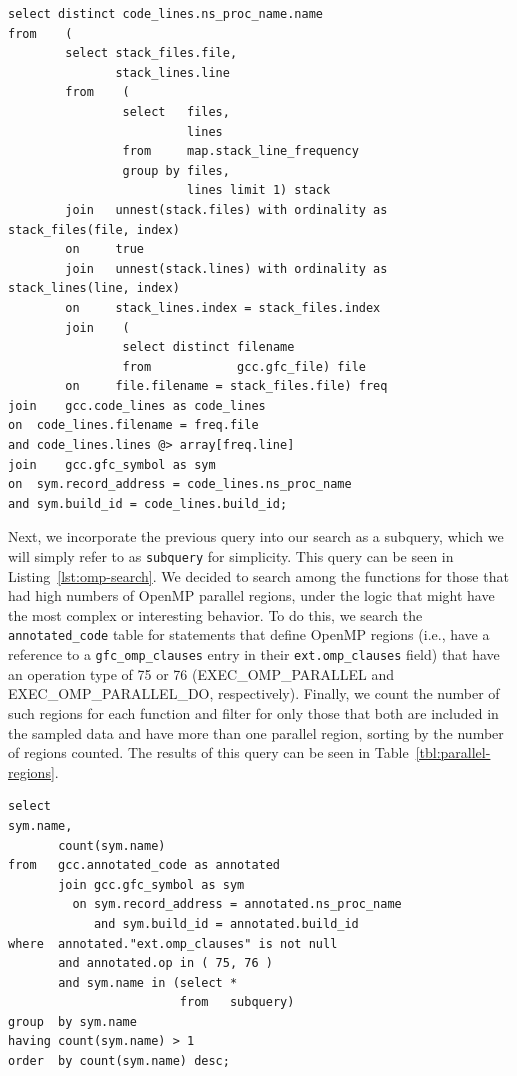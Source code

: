 \begin{lstlisting}[caption=Determing Functions Sampled, label=lst:restrict]
select distinct code_lines.ns_proc_name.name
from	(
		select stack_files.file,
		       stack_lines.line
		from	(
				select   files,
				         lines
				from     map.stack_line_frequency
				group by files,
				         lines limit 1) stack
		join   unnest(stack.files) with ordinality as stack_files(file, index)
		on     true
		join   unnest(stack.lines) with ordinality as stack_lines(line, index)
		on     stack_lines.index = stack_files.index
		join	(
				select distinct filename
				from            gcc.gfc_file) file
		on     file.filename = stack_files.file) freq
join	gcc.code_lines as code_lines
on	code_lines.filename = freq.file
and	code_lines.lines @> array[freq.line]
join	gcc.gfc_symbol as sym
on	sym.record_address = code_lines.ns_proc_name
and	sym.build_id = code_lines.build_id;
\end{lstlisting}

Next, we incorporate the previous query into our search as a subquery, which we will simply refer to 
as \texttt{subquery} for simplicity.
This query can be seen in Listing~\ref{lst:omp-search}.
We decided to search among the functions for those that had high numbers of OpenMP parallel regions, under 
the logic that might have the most complex or interesting behavior.
To do this, we search the \texttt{annotated\_code} table for statements that define OpenMP regions 
(i.e., have a reference to a \texttt{gfc\_omp\_clauses} entry in their \texttt{ext.omp\_clauses} field) 
that have an operation type of 75 or 76 (EXEC\_OMP\_PARALLEL and 
EXEC\_OMP\_PARALLEL\_DO, respectively).
Finally, we count the number of such regions for each function and filter for only those that both are 
included in the sampled data and have more than one parallel region, sorting by the number of 
regions counted.
The results of this query can be seen in Table~\ref{tbl:parallel-regions}.

\begin{lstlisting}[caption=Finding High Concentrations of OpenMP Parallel Regions, 
label=lst:omp-search]
select 
sym.name,
       count(sym.name)
from   gcc.annotated_code as annotated
       join gcc.gfc_symbol as sym
         on sym.record_address = annotated.ns_proc_name
            and sym.build_id = annotated.build_id
where  annotated."ext.omp_clauses" is not null
       and annotated.op in ( 75, 76 )
       and sym.name in (select *
                        from   subquery)
group  by sym.name
having count(sym.name) > 1
order  by count(sym.name) desc;  
\end{lstlisting}


